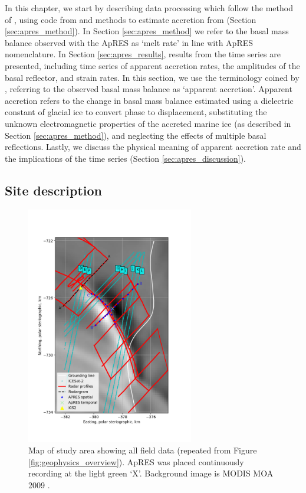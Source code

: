 In this chapter, we start by describing data processing  which follow the method of \cite{nicholls2015ground}, using code from \cite{stewart2018ice} and methods to estimate accretion from \cite{vavnkova2021nature} (Section \ref{sec:apres_method}). In Section \ref{sec:apres_method} we refer to the basal mass balance observed with the ApRES as `melt rate' in line with ApRES nomenclature. In Section \ref{sec:apres_results}, results from the time series are presented, including time series of apparent accretion rates, the amplitudes of the basal reflector, and strain rates. In this section, we use the terminology coined by \cite{vavnkova2021nature}, referring to the observed basal mass balance as `apparent accretion'. Apparent accretion refers to the change in basal mass balance estimated using a dielectric constant of glacial ice to convert phase to displacement, substituting the unknown electromagnetic properties of the accreted marine ice (as described in Section \ref{sec:apres_method}), and neglecting the effects of multiple basal reflections.
 Lastly, we discuss the physical meaning of apparent accretion rate and the implications of the time series (Section \ref{sec:apres_discussion}).

\newpage

\subsection{Site description}

\begin{figure}[!ht]
\centering
\includegraphics[width=0.65\textwidth]{chapters/2/geophysics_overview.png}
\caption[Map of field data]{Map of study area showing all field data (repeated from Figure \ref{fig:geophysics_overview}). ApRES was placed continuously recording at the light green `X'.
Background image is MODIS MOA 2009 \citep{haran2014modis}. 
}
\label{fig:geophysics_overview_apres}
\end{figure}


